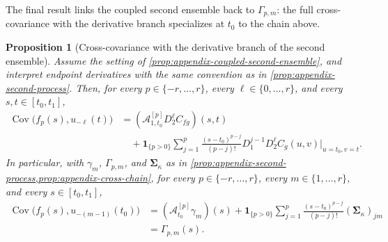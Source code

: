 \documentclass[11pt,a4paper]{article}
\newtheorem{proposition}{Proposition}
\theoremstyle{definition}
\theoremstyle{remark}
\DeclareMathOperator{\Cov}{Cov}
\begin{document}
The final result links the coupled second ensemble back to \(\Gamma_{p,m}\): the full cross-covariance with the derivative branch specializes at \(t_0\) to the chain above.



\begin{proposition}[Cross-covariance with the derivative branch of the second ensemble]\label{prop:appendix-crosscov-second-ensemble}
Assume the setting of \cref{prop:appendix-coupled-second-ensemble}, and interpret endpoint derivatives with the same convention as in \cref{prop:appendix-second-process}. Then, for every \(p\in\{-r,\ldots,r\}\), every \(\ell\in\{0,\ldots,r\}\), and every \(s,t\in[t_0,t_1]\),
\begin{align*}
\Cov\bigl(f_p(s),u_{-\ell}(t)\bigr)
&=(\mathcal A_{1,t_0}^{[p]}D_2^{\ell}C_{fg})(s,t)\\
&\quad+\mathbf{1}_{\{p>0\}}\sum_{j=1}^{p}\frac{(s-t_0)^{p-j}}{(p-j)!}D_1^{j-1}D_2^{\ell}C_g(u,v)\big|_{u=t_0,v=t}.
\end{align*}
In particular, with \(\gamma_m\), \(\Gamma_{p,m}\), and \(\boldsymbol{\Sigma}_{\kappa}\) as in \cref{prop:appendix-second-process,prop:appendix-cross-chain}, for every \(p\in\{-r,\ldots,r\}\), every \(m\in\{1,\ldots,r\}\), and every \(s\in[t_0,t_1]\),
\begin{align*}
\Cov\bigl(f_p(s),u_{-(m-1)}(t_0)\bigr)
&=(\mathcal A_{t_0}^{[p]}\gamma_m)(s)+\mathbf{1}_{\{p>0\}}\sum_{j=1}^{p}\frac{(s-t_0)^{p-j}}{(p-j)!}(\boldsymbol{\Sigma}_{\kappa})_{jm}\\
&=\Gamma_{p,m}(s).
\end{align*}
\end{proposition}
\end{document}
